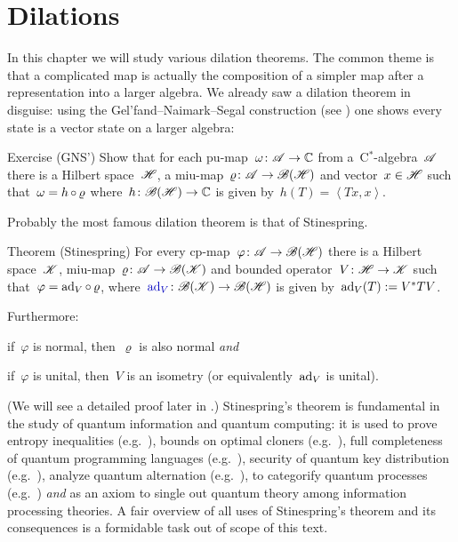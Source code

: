 \documentclass[b]{subfiles}
\begin{document}
\chapter{Dilations}

\begin{parsec}%
\begin{point}%
In this chapter we will study various dilation theorems.
The common theme is that a complicated map
    is actually the composition of a simpler map
    after a representation into a larger algebra.
We already saw a dilation theorem in disguise:
    using the Gel'fand--Naimark--Segal construction (see )
    one shows every state is a vector state on a larger algebra:
\end{point}
\begin{point}{Exercise (GNS')}%
    Show that
    for each pu-map~$\omega\colon \mathscr{A} \to \mathbb{C}$
        from a~C$^*$-algebra~$\mathscr{A}$
    there is a Hilbert space~$\mathscr{H}$,
    a miu-map~$\varrho\colon \mathscr{A} \to \mathscr{B}(\mathscr{H})$
    and vector~$x \in \mathscr{H}$
    such that~$\omega = h \mathop{\circ} \varrho$
    where~$h \colon \mathscr{B}(\mathscr{H}) \to \mathbb{C}$
    is given by~$h(T) = \left<Tx,x\right>$.
\end{point}

\begin{point}%
Probably the most famous dilation theorem is that
of Stinespring\cite[Thm.~1]{stinespring}.
\end{point}

\begin{point}{Theorem (Stinespring)}
    For every cp-map~$\varphi\colon \mathscr{A} \to \mathscr{B} (\mathscr{H})$
    there is a Hilbert space~$\mathscr{K}$,
        miu-map~$\varrho\colon \mathscr{A} \to \mathscr{B}(\mathscr{K})$
        and bounded operator~$V\colon \mathscr{H} \to \mathscr{K}$
        such that~$\varphi = \mathrm{ad}_V \mathop{\circ} \varrho$,
        where~$\Define{\ad_V} \colon \scrB(\scrK) \to \scrB(\scrH)$
        is given by~$\mathrm{ad}_V(T):= V^*TV$.

Furthermore:
\begin{inparaenum}
\item
    if~$\varphi$ is normal, then~$\varrho$ is also normal \emph{and}
\item
    if~$\varphi$ is unital, then~$V$ is an isometry
        (or equivalently~$\mathrm{ad}_V$ is unital).
\end{inparaenum}
\end{point}

\begin{point}%
(We will see a detailed proof later in \TODO{}.)
Stinespring's theorem
is fundamental in the study
of quantum information and quantum computing:
it is used to prove entropy inequalities (e.g.~\cite{lindblad}),
bounds on optimal cloners (e.g.~\cite{werner}),
full completeness of quantum programming languages (e.g.~\cite{staton}),
security of quantum key distribution (e.g.~\cite{werner2}),
analyze quantum alternation (e.g.~\cite{prakash}),
to categorify quantum processes (e.g.~\cite{selinger}) \emph{and}
as an axiom to single out
quantum theory among information processing theories.\cite{chiribella}
A fair overview of all uses of Stinespring's theorem and its consequences
is a formidable task out of scope of this text.


\end{point}
\end{parsec}
\end{document}
